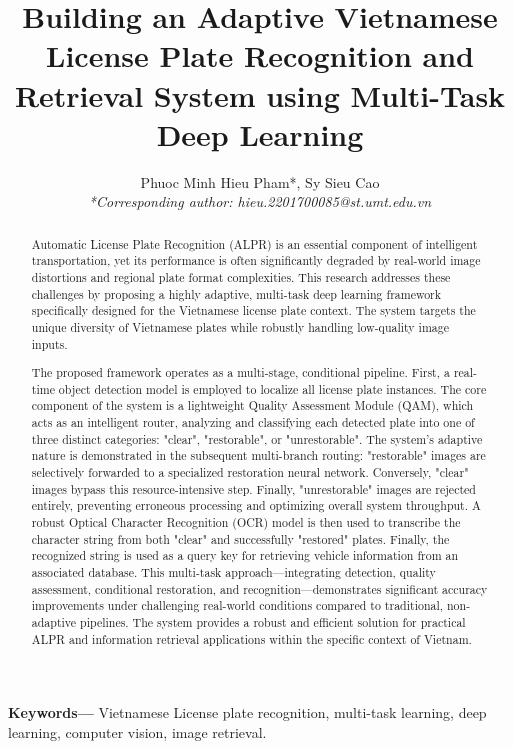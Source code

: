 \documentclass[a4paper,11pt]{article}
\title{\vspace{-2em}\bfseries
	Building an Adaptive Vietnamese License Plate Recognition and Retrieval System using Multi-Task Deep Learning
}
\author{
	Phuoc Minh Hieu Pham*, Sy Sieu Cao\\
	\small \textit{*Corresponding author: hieu.2201700085@st.umt.edu.vn}
}
\date{}
\begin{document}
\maketitle

\begin{abstract}
	Automatic License Plate Recognition (ALPR) is an essential component of intelligent transportation, yet its performance is often significantly degraded by real-world image distortions and regional plate format complexities. This research addresses these challenges by proposing a highly adaptive, multi-task deep learning framework specifically designed for the Vietnamese license plate context. The system targets the unique diversity of Vietnamese plates while robustly handling low-quality image inputs.
	
	The proposed framework operates as a multi-stage, conditional pipeline. First, a real-time object detection model is employed to localize all license plate instances. The core component of the system is a lightweight Quality Assessment Module (QAM), which acts as an intelligent router, analyzing and classifying each detected plate into one of three distinct categories: "clear", "restorable", or "unrestorable". The system's adaptive nature is demonstrated in the subsequent multi-branch routing: "restorable" images are selectively forwarded to a specialized restoration neural network. Conversely, "clear" images bypass this resource-intensive step. Finally, "unrestorable" images are rejected entirely, preventing erroneous processing and optimizing overall system throughput. A robust Optical Character Recognition (OCR) model is then used to transcribe the character string from both "clear" and successfully "restored" plates. Finally, the recognized string is used as a query key for retrieving vehicle information from an associated database. This multi-task approach—integrating detection, quality assessment, conditional restoration, and recognition—demonstrates significant accuracy improvements under challenging real-world conditions compared to traditional, non-adaptive pipelines. The system provides a robust and efficient solution for practical ALPR and information retrieval applications within the specific context of Vietnam.

\end{abstract}

\vspace{0.5em}

\textbf{\small Keywords—}
Vietnamese License plate recognition, multi-task learning, deep learning, computer vision, image retrieval.
\end{document}
